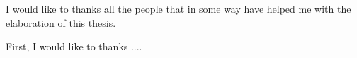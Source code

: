 \begin{acknowledgements}

I would like to thanks all the people that in some way have helped me with the elaboration of this thesis.

First, I would like to thanks ....
\end{acknowledgements}